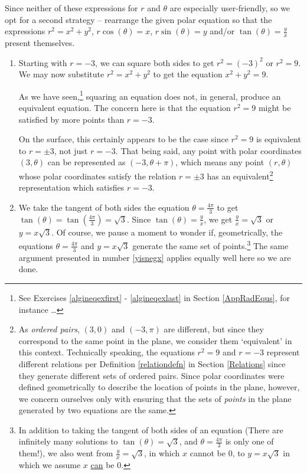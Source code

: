 \documentclass{ximera}
\begin{document}
\begin{ex}
\begin{enumerate}
Since neither of these expressions for $r$ and $\theta$ are especially user-friendly, so we opt for a second strategy -- rearrange the given polar equation so that the expressions $r^2 = x^2+y^2$, $r\cos(\theta)=x$,  $r\sin(\theta)=y$ and/or $\tan(\theta) = \frac{y}{x}$ present themselves.

\begin{enumerate}

\item Starting with $r = -3$, we can square both sides to get  $r^2 = (-3)^2$ or $r^2 = 9$.  We may now substitute $r^2 = x^2+y^2$ to get the equation $x^2+y^2 = 9$.  

\smallskip

As we have seen,\footnote{See Exercises \ref{algineqexfirst} - \ref{algineqexlast} in Section \ref{AppRadEqus}, for instance \ldots} squaring an equation does not, in general, produce an equivalent equation.  The concern here is that the equation $r^2 = 9$ might be satisfied by more points than  $r = -3$.  

\smallskip

On the surface, this certainly appears to be the case since $r^2 = 9$ is equivalent to $r = \pm 3$, not just $r=-3$.  That being said,  any point with polar coordinates $(3,\theta)$ can be represented as $(-3,\theta + \pi)$, which means any point $(r,\theta)$ whose polar coordinates satisfy the relation $r = \pm 3$ has an equivalent\footnote{As \textit{ordered pairs}, $(3,0)$ and $(-3,\pi)$ are different, but since they correspond to the same point in the plane, we consider them `equivalent'  in this context. Technically speaking,  the equations $r^2 = 9$ and $r=-3$ represent different relations per Definition \ref{relationdefn} in Section \ref{Relations} since they generate different sets of ordered pairs.  Since polar coordinates were defined geometrically to describe the location of points in the plane, however, we concern ourselves only with ensuring that the sets of \textit{points} in the plane generated by two equations are the same.  } representation which satisfies $r=-3$.

\item  We take the tangent of both sides the equation $\theta = \frac{4\pi}{3}$ to get $\tan(\theta) = \tan\left(\frac{4\pi}{3}\right) = \sqrt{3}$.  Since $\tan(\theta) = \frac{y}{x}$, we get $\frac{y}{x} = \sqrt{3}$ or $y = x\sqrt{3}$.  Of course, we pause a moment to wonder if, geometrically, the equations $\theta = \frac{4\pi}{3}$ and $y = x\sqrt{3}$ generate the same set of points.\footnote{In addition to taking the tangent of both sides of an equation (There are infinitely many solutions to $\tan(\theta) = \sqrt{3}$, and $\theta = \frac{4\pi}{3}$ is only one of them!), we also went from $\frac{y}{x} = \sqrt{3}$, in which $x$ cannot be $0$, to $y = x\sqrt{3}$ in which we assume $x$ \underline{can} be $0$.}  The same argument presented in number \ref{yisnegx} applies equally well here so we are done.


\end{enumerate}
\end{enumerate}
\end{ex}
\end{document}
